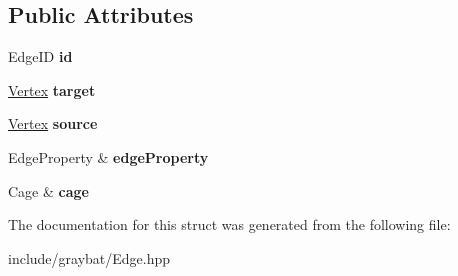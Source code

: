 \subsection*{Public Attributes}
\begin{DoxyCompactItemize}
\item 
\hypertarget{structgraybat_1_1CommunicationEdge_a468626e784f770368bc8335e78137b48}{}Edge\+I\+D {\bfseries id}\label{structgraybat_1_1CommunicationEdge_a468626e784f770368bc8335e78137b48}

\item 
\hypertarget{structgraybat_1_1CommunicationEdge_a6061ba74338b175e03ffdb97347c5e77}{}\hyperlink{structgraybat_1_1CommunicationVertex}{Vertex} {\bfseries target}\label{structgraybat_1_1CommunicationEdge_a6061ba74338b175e03ffdb97347c5e77}

\item 
\hypertarget{structgraybat_1_1CommunicationEdge_ac4fb6170c3d484c65363a197503e5bd7}{}\hyperlink{structgraybat_1_1CommunicationVertex}{Vertex} {\bfseries source}\label{structgraybat_1_1CommunicationEdge_ac4fb6170c3d484c65363a197503e5bd7}

\item 
\hypertarget{structgraybat_1_1CommunicationEdge_a999ecb1277ae0d0c476aed644c71341e}{}Edge\+Property \& {\bfseries edge\+Property}\label{structgraybat_1_1CommunicationEdge_a999ecb1277ae0d0c476aed644c71341e}

\item 
\hypertarget{structgraybat_1_1CommunicationEdge_aa70fd4d28fea47444546f3891c0800ce}{}Cage \& {\bfseries cage}\label{structgraybat_1_1CommunicationEdge_aa70fd4d28fea47444546f3891c0800ce}

\end{DoxyCompactItemize}


The documentation for this struct was generated from the following file\+:\begin{DoxyCompactItemize}
\item 
include/graybat/Edge.\+hpp\end{DoxyCompactItemize}
